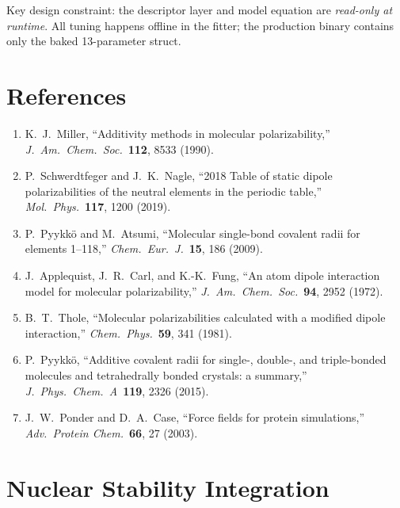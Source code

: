 \documentclass[11pt,letterpaper]{article}
\begin{document}
\noindent Key design constraint: the descriptor layer and model equation
are \emph{read-only at runtime}.  All tuning happens offline in the fitter;
the production binary contains only the baked 13-parameter struct.

\section*{References}

\begin{enumerate}
\item[{[1]}] K.~J.~Miller, ``Additivity methods in molecular
  polarizability,'' \emph{J.\ Am.\ Chem.\ Soc.}\ \textbf{112}, 8533
  (1990).

\item[{[2]}] P.~Schwerdtfeger and J.~K.~Nagle, ``2018 Table of static
  dipole polarizabilities of the neutral elements in the periodic table,''
  \emph{Mol.\ Phys.}\ \textbf{117}, 1200 (2019).

\item[{[3]}] P.~Pyykk\"o and M.~Atsumi, ``Molecular single-bond covalent
  radii for elements 1--118,'' \emph{Chem.\ Eur.\ J.}\ \textbf{15}, 186
  (2009).

\item[{[4]}] J.~Applequist, J.~R.~Carl, and K.-K.~Fung, ``An atom dipole
  interaction model for molecular polarizability,'' \emph{J.\ Am.\ Chem.\
  Soc.}\ \textbf{94}, 2952 (1972).

\item[{[5]}] B.~T.~Thole, ``Molecular polarizabilities calculated with a
  modified dipole interaction,'' \emph{Chem.\ Phys.}\ \textbf{59}, 341
  (1981).

\item[{[6]}] P.~Pyykk\"o, ``Additive covalent radii for single-, double-,
  and triple-bonded molecules and tetrahedrally bonded crystals: a
  summary,'' \emph{J.\ Phys.\ Chem.\ A}\ \textbf{119}, 2326 (2015).

\item[{[7]}] J.~W.~Ponder and D.~A.~Case, ``Force fields for protein
  simulations,'' \emph{Adv.\ Protein Chem.}\ \textbf{66}, 27 (2003).
\end{enumerate}

\section{Nuclear Stability Integration}
\label{sec:nuclear}
\end{document}
